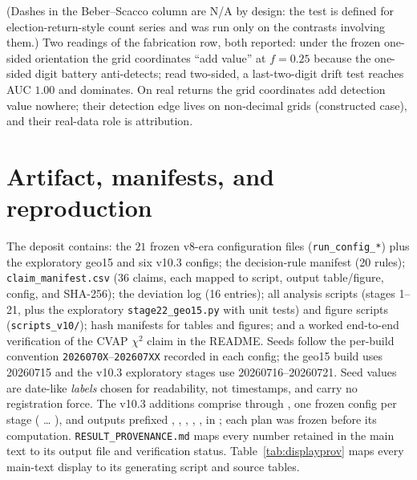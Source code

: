 \documentclass[12pt]{article}
\begin{document}
(Dashes in the Beber--Scacco column are N/A by design: the test is defined
for election-return-style count series and was run only on the contrasts
involving them.) Two readings of the fabrication row, both reported: under the frozen one-sided
orientation the grid coordinates ``add value'' at $f = 0.25$ because the
one-sided digit battery anti-detects; read two-sided, a last-two-digit drift
test reaches AUC $1.00$ and dominates. On real returns the grid coordinates
add detection value nowhere; their detection edge lives on non-decimal grids
(constructed case), and their real-data role is attribution.

\section{Artifact, manifests, and reproduction}
\label{s:artifact}

The deposit contains: the $21$ frozen v8-era configuration files
(\texttt{run\_config\_*}) plus the exploratory geo15 and six v10.3 configs;
the decision-rule manifest (20 rules); \texttt{claim\_manifest.csv} (36
claims, each mapped to script, output table/figure, config, and SHA-256);
the deviation log (16 entries); all analysis scripts (stages 1--21, plus the
exploratory \texttt{stage22\_geo15.py} with unit tests) and figure scripts
(\texttt{scripts\_v10/}); hash manifests for tables and figures; and a worked
end-to-end verification of the CVAP $\chi^2$ claim in the README. Seeds
follow the per-build convention \texttt{2026070X}--\texttt{202607XX}
recorded in each config; the geo15 build uses 20260715 and the v10.3
exploratory stages use 20260716--20260721. Seed values are date-like
\emph{labels} chosen for readability, not timestamps, and carry no
registration force. The v10.3 additions comprise
 through , one frozen
config per stage ( \ldots{}
), and outputs prefixed
, , , ,
,  in ; each plan was frozen
before its computation. \texttt{RESULT\_PROVENANCE.md} maps every
number retained in the main text to its output file and verification status.
Table~\ref{tab:displayprov} maps every main-text display to its generating
script and source tables.
\end{document}
